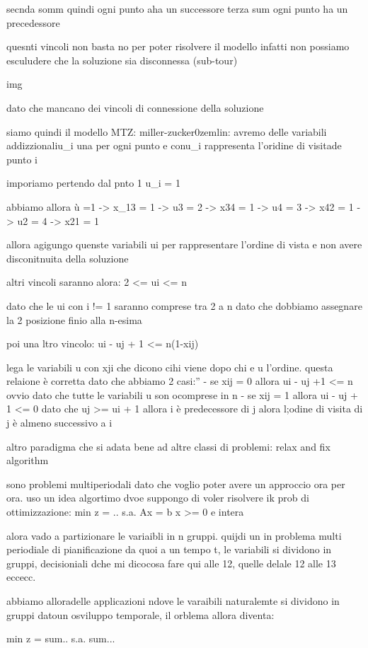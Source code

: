 secnda somm quindi ogni punto aha un successore
terza sum ogni punto ha un precedessore

quesnti vincoli non basta no per poter risolvere il modello infatti non possiamo esculudere che la soluzione sia disconnessa (sub-tour)


img


dato che mancano dei vincoli di connessione della soluzione


siamo quindi il modello MTZ: miller-zucker0zemlin:
avremo delle variabili addizzionaliu_i una per ogni punto e conu_i rappresenta l’oridine di visitade punto i

imporiamo pertendo dal pnto 1
u_i = 1

abbiamo allora ù =1 -> x_13 = 1 -> u3 = 2 -> x34 = 1 -> u4 = 3 -> x42 = 1 -> u2 = 4 -> x21 = 1

allora agigungo quenste variabili ui per rappresentare l’ordine di vista e non avere disconitnuita della soluzione

altri vincoli saranno alora:
2 <= ui <= n

dato che le ui con i != 1 saranno comprese tra 2 a n dato che dobbiamo assegnare la 2 posizione finio alla n-esima

poi una ltro vincolo:
ui - uj + 1 <= n(1-xij)

lega le variabili u con xji che dicono cihi viene dopo chi e u l’ordine. questa relaione è corretta dato che abbiamo 2 casi:”
- se xij = 0 allora ui - uj +1 <= n ovvio dato che tutte le variabili u son ocomprese in n 
- se xij = 1 allora ui - uj + 1 <= 0 dato che uj >= ui + 1 allora i è predecessore di j  alora l;odine di visita di j è almeno successivo a i


altro paradigma che si adata bene ad altre classi di problemi:
relax and fix algorithm

sono problemi multiperiodali dato che voglio poter avere un approccio ora per ora. uso un idea algortimo dvoe suppongo di voler risolvere ik prob di ottimizzazione:
min z = ..
s.a.
Ax = b
x >= 0 e intera

alora vado a partizionare le variaibli in n gruppi. quijdi un in problema multi periodiale di pianificazione da quoi a un tempo t, le variabili si dividono in gruppi, decisioniali dche mi dicocosa fare qui alle 12, quelle delale 12 alle 13 eccecc.

abbiamo alloradelle applicazioni ndove le varaibili naturalemte si dividono in gruppi datoun osviluppo temporale, il orblema allora diventa:

min z = sum..
s.a.
sum...

